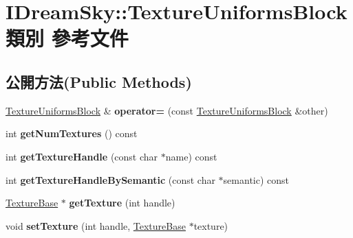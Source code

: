 \hypertarget{class_i_dream_sky_1_1_texture_uniforms_block}{}\section{I\+Dream\+Sky\+:\+:Texture\+Uniforms\+Block 類別 參考文件}
\label{class_i_dream_sky_1_1_texture_uniforms_block}
\subsection*{公開方法(Public Methods)}
\begin{DoxyCompactItemize}
\item 
\hyperlink{class_i_dream_sky_1_1_texture_uniforms_block}{Texture\+Uniforms\+Block} \& {\bfseries operator=} (const \hyperlink{class_i_dream_sky_1_1_texture_uniforms_block}{Texture\+Uniforms\+Block} \&other)\hypertarget{class_i_dream_sky_1_1_texture_uniforms_block_a4486fb3e3aee498f9bafbb0b2979f7b4}{}\label{class_i_dream_sky_1_1_texture_uniforms_block_a4486fb3e3aee498f9bafbb0b2979f7b4}

\item 
int {\bfseries get\+Num\+Textures} () const \hypertarget{class_i_dream_sky_1_1_texture_uniforms_block_abdd0f19fffb45b4bf68e58857a269953}{}\label{class_i_dream_sky_1_1_texture_uniforms_block_abdd0f19fffb45b4bf68e58857a269953}

\item 
int {\bfseries get\+Texture\+Handle} (const char $\ast$name) const \hypertarget{class_i_dream_sky_1_1_texture_uniforms_block_a0e286b56e5a24023faa6f43af26c3550}{}\label{class_i_dream_sky_1_1_texture_uniforms_block_a0e286b56e5a24023faa6f43af26c3550}

\item 
int {\bfseries get\+Texture\+Handle\+By\+Semantic} (const char $\ast$semantic) const \hypertarget{class_i_dream_sky_1_1_texture_uniforms_block_a027e8943d5344f71792b4ac581ff1725}{}\label{class_i_dream_sky_1_1_texture_uniforms_block_a027e8943d5344f71792b4ac581ff1725}

\item 
\hyperlink{class_i_dream_sky_1_1_texture_base}{Texture\+Base} $\ast$ {\bfseries get\+Texture} (int handle)\hypertarget{class_i_dream_sky_1_1_texture_uniforms_block_aec3ab5e921a529fdbe55a97fcbaed857}{}\label{class_i_dream_sky_1_1_texture_uniforms_block_aec3ab5e921a529fdbe55a97fcbaed857}

\item 
void {\bfseries set\+Texture} (int handle, \hyperlink{class_i_dream_sky_1_1_texture_base}{Texture\+Base} $\ast$texture)\hypertarget{class_i_dream_sky_1_1_texture_uniforms_block_a2de9fd4655163383e0a56bf0b6eec342}{}\label{class_i_dream_sky_1_1_texture_uniforms_block_a2de9fd4655163383e0a56bf0b6eec342}


\end{DoxyCompactItemize}

